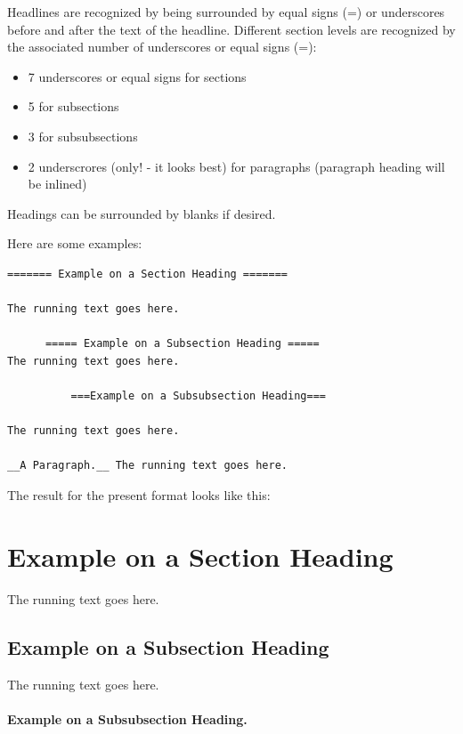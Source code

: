 \documentclass{article}
\begin{document}
 

Headlines are recognized by being surrounded by equal signs (=) or
underscores before and after the text of the headline. Different
section levels are recognized by the associated number of underscores
or equal signs (=):

\begin{itemize}
   \item 7 underscores or equal signs for sections

   \item 5 for subsections

   \item 3 for subsubsections

   \item 2 underscrores (only! - it looks best) for paragraphs 
     (paragraph heading will be inlined)
\end{itemize}

\noindent
Headings can be surrounded by blanks if desired.

Here are some examples:
\begin{Verbatim}[fontsize=\fontsize{9pt}{9pt},tabsize=8,baselinestretch=0.85,
fontfamily=tt,xleftmargin=7mm]
======= Example on a Section Heading ======= 

The running text goes here. 

      ===== Example on a Subsection Heading ===== 
The running text goes here.

          ===Example on a Subsubsection Heading===

The running text goes here.

__A Paragraph.__ The running text goes here.
\end{Verbatim}
\noindent

The result for the present format looks like this:


\section{Example on a Section Heading}

The running text goes here. 

\subsection{Example on a Subsection Heading}

The running text goes here.
\paragraph{Example on a Subsubsection Heading.}
\end{document}
